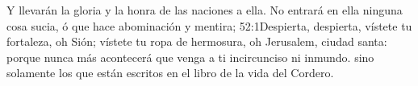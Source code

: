 Y llevarán la gloria y la honra de las naciones a ella. 
No entrará en ella ninguna cosa sucia, ó que hace abominación y mentira;%
				{52:1}{Despierta, despierta, vístete tu fortaleza, oh Sión; vístete tu ropa de hermosura, oh Jerusalem, ciudad santa: porque nunca más acontecerá que venga a ti incircunciso ni inmundo.} %
 sino solamente los que están escritos en el libro de la vida del Cordero.%
